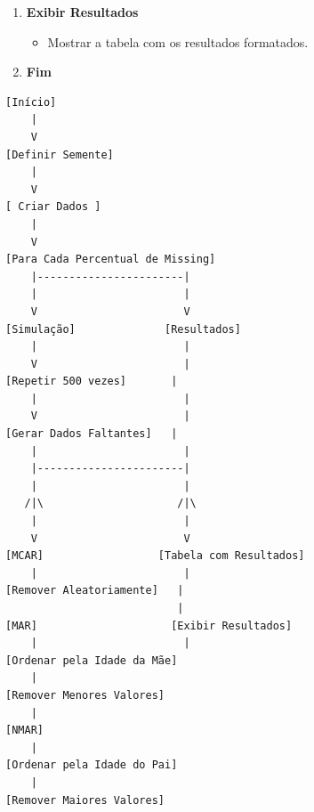 \documentclass[11pt]{article}
\begin{document}
\begin{enumerate}
  \begin{itemize}
    \item Armazenar as médias das idades imputadas, RB e RMSE em uma tabela.
  \end{itemize}
  \item \textbf{Exibir Resultados}

  \begin{itemize}
    \item Mostrar a tabela com os resultados formatados.
  \end{itemize}
  \item \textbf{Fim}

\end{enumerate}

\begin{verbatim}
[Início]
    |
    V
[Definir Semente]
    |
    V
[ Criar Dados ]
    |
    V
[Para Cada Percentual de Missing]
    |-----------------------|
    |                       |
    V                       V
[Simulação]              [Resultados]
    |                       |
    V                       |
[Repetir 500 vezes]       |
    |                       |
    V                       |
[Gerar Dados Faltantes]   |
    |                       |
    |-----------------------|
    |                       |
   /|\                     /|\
    |                       |
    V                       V
[MCAR]                  [Tabela com Resultados]
    |                       |
[Remover Aleatoriamente]   |
                           |
[MAR]                     [Exibir Resultados]
    |                       |
[Ordenar pela Idade da Mãe] 
    |
[Remover Menores Valores]
    |
[NMAR]
    |
[Ordenar pela Idade do Pai]
    |
[Remover Maiores Valores]
\end{verbatim}
\end{document}
